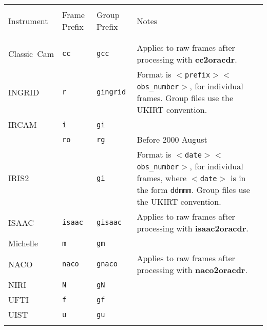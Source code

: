 \documentclass[twoside,11pt,nolof]{starlink}
\begin{document}
\begin{center}
\begin{tabular}{lllp{71mm}}
\hline
           &              &               & \\
Instrument~& Frame Prefix & Group Prefix  & Notes \\
           &              &               & \\ \hline
           &              &               & \\ \medskip
Classic~Cam& {\tt{cc}}    & {\tt{gcc}}    & Applies to raw frames after
                                            processing with {\bf{cc2oracdr}}. \\
INGRID     & {\tt{r}}     & {\tt{gingrid}}& Format is {\tt$<$prefix$><$obs\_number$>$},
                                            for individual frames.  Group files
                                            use the UKIRT convention. \\
IRCAM      & {\tt{i}}     & {\tt{gi}}     & \\ \medskip
           & {\tt{ro}}    & {\tt{rg}}     & Before 2000 August \\ \medskip
IRIS2      &              & {\tt{gi}}     & Format is {\tt$<$date$><$obs\_number$>$},
                                            for individual frames, where {\tt$<$date$>$}
                                            is in the form {\tt{ddmmm}}.   Group files
                                            use the UKIRT convention. \\ \medskip
ISAAC      & {\tt{isaac}} & {\tt{gisaac}} & Applies to raw frames after
                                            processing with {\bf{isaac2oracdr}}. \\ \medskip
Michelle   & {\tt{m}}     & {\tt{gm}}     & \\ \medskip
NACO       & {\tt{naco}}  & {\tt{gnaco}}  & Applies to raw frames after
                                            processing with {\bf{naco2oracdr}}. \\ \medskip
NIRI       & {\tt{N}}     & {\tt{gN}}     & \\ \medskip
UFTI       & {\tt{f}}     & {\tt{gf}}     & \\ \medskip
UIST       & {\tt{u}}     & {\tt{gu}}     & \\
           &              &               & \\ \hline
\end{tabular}
\end{center}
\bigskip
\end{document}
